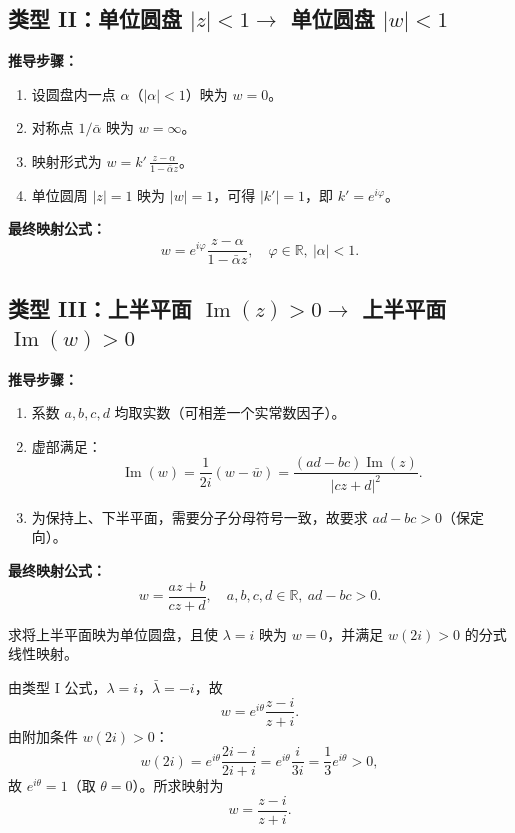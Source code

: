 \subsection{类型 II：单位圆盘 \(|z| < 1 \to\) 单位圆盘 \(|w| < 1\)}
\begin{tcolorbox}[colframe=orange!75!black, colback=orange!5!white, leftrule=4pt, rightrule=0pt, toprule=0pt, bottomrule=0pt, sharp corners]
  \textbf{推导步骤：}
  \begin{enumerate}
    \item 设圆盘内一点 \(\alpha\)（\(|\alpha| < 1\)）映为 \(w=0\)。
    \item 对称点 \(1/\bar{\alpha}\) 映为 \(w=\infty\)。
    \item 映射形式为 \(\displaystyle w = k' \,\frac{z - \alpha}{1 - \bar{\alpha}z}\)。
    \item 单位圆周 \(|z|=1\) 映为 \(|w|=1\)，可得 \(|k'|=1\)，即 \(k' = e^{i\varphi}\)。
  \end{enumerate}
  \tcbline
  \textbf{最终映射公式：}
  \[
  w = e^{i\varphi} \frac{z - \alpha}{1 - \bar{\alpha}z}, \quad \varphi\in\mathbb{R},\ |\alpha| < 1.
  \]
\end{tcolorbox}

\subsection{类型 III：上半平面 \(\operatorname{Im}(z) > 0 \to\) 上半平面 \(\operatorname{Im}(w) > 0\)}
\begin{tcolorbox}[colframe=orange!75!black, colback=orange!5!white, leftrule=4pt, rightrule=0pt, toprule=0pt, bottomrule=0pt, sharp corners]
  \textbf{推导步骤：}
  \begin{enumerate}
    \item 系数 \(a,b,c,d\) 均取实数（可相差一个实常数因子）。
    \item 虚部满足：
    \[
    \operatorname{Im}(w) = \frac{1}{2i}(w - \bar{w}) = \frac{(ad-bc)\operatorname{Im}(z)}{|cz+d|^2}.
    \]
    \item 为保持上、下半平面，需要分子分母符号一致，故要求 \(ad - bc > 0\)（保定向）。
  \end{enumerate}
  \tcbline
  \textbf{最终映射公式：}
  \[
  w = \frac{az + b}{cz + d}, \quad a,b,c,d\in\mathbb{R},\ ad-bc > 0.
  \]
\end{tcolorbox}

\begin{example}
  求将上半平面映为单位圆盘，且使 \(\lambda = i\) 映为 \(w=0\)，并满足 \(w(2i) > 0\) 的分式线性映射。
\end{example}
\begin{solution}
  由类型 I 公式，\(\lambda = i\)，\(\bar{\lambda} = -i\)，故
  \[
  w = e^{i\theta} \frac{z - i}{z + i}.
  \]
  由附加条件 \(w(2i) > 0\)：
  \[
  w(2i) = e^{i\theta} \frac{2i - i}{2i + i} = e^{i\theta} \frac{i}{3i} = \frac{1}{3} e^{i\theta} > 0,
  \]
  故 \(e^{i\theta} = 1\)（取 \(\theta = 0\)）。所求映射为
  \[
  w = \frac{z - i}{z + i}.
  \]
\end{solution}

